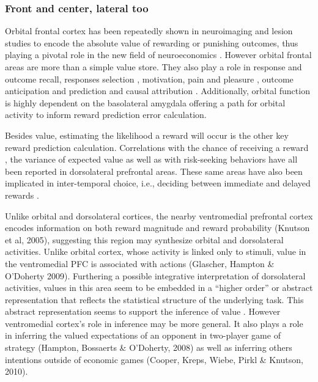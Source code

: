 \subsubsection{Front and center, lateral too}
\label{subsub:fclt}
Orbital frontal cortex has been repeatedly shown in neuroimaging \cite{ODoherty:2001p2423} and lesion \cite{Hornak:2004p6234} studies to encode the absolute value of rewarding or punishing outcomes, thus playing a pivotal role in the new field of neuroeconomics \cite{Glimcher:2005p863}.  However orbital frontal areas are more than a simple value store.  They also play a role in response and outcome recall, responses selection \cite{Rudebeck:2008p4712, Furuyashiki:2008p1631}, motivation, pain and pleasure \cite{Atlas:2010p7566}, outcome anticipation and prediction \cite{Tanaka:2006fk, Roesch:2007p7182} and causal attribution \cite{Tanaka:2008p3265}.  Additionally, orbital function is highly dependent on the basolateral amygdala \cite{ODoherty:2003p2616} offering a path for orbital activity to inform reward prediction error calculation.  

Besides value, estimating the likelihood a reward will occur is the other key reward prediction calculation.  Correlations with the chance of receiving a reward \cite{Tobler:2009p8297}, the variance of expected value \cite{Kahnt:2010p7677} as well as with risk-seeking behaviors \cite{Tobler:2007p1562} have all been reported in dorsolateral prefrontal areas.  These same areas have also been implicated in inter-temporal choice, i.e., deciding between immediate and delayed rewards \cite{Kim:2009p8304,Kim:2008p2984}.

Unlike orbital and dorsolateral cortices, the nearby ventromedial prefrontal cortex encodes information on both reward magnitude and reward probability (Knutson et al, 2005), suggesting this region may synthesize orbital and dorsolateral activities.  Unlike orbital cortex, whose activity is linked only to stimuli, value in the ventromedial PFC is associated with actions (Glascher, Hampton \& O’Doherty 2009).   Furthering a possible integrative interpretation of dorsolateral activities, values in this area seem to be embedded in a ``higher order''  or abstract representation that reflects the statistical structure of the underlying task.  This abstract representation seems to support the inference of value \cite{Hampton:2006p2577}.  However ventromedial cortex's role in inference may be more general. It also plays a role in inferring the valued expectations of an opponent in two-player game of strategy (Hampton, Bossaerts \& O'Doherty, 2008) as well as inferring others intentions outside of economic games (Cooper, Kreps, Wiebe, Pirkl \& Knutson, 2010).

